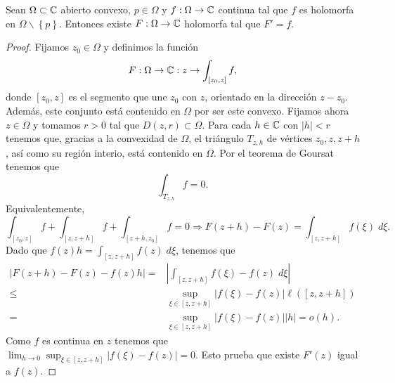 \begin{theorem}
	Sean $\displaystyle \Omega\subset \mathbb{C} $ abierto convexo, $\displaystyle p \in \Omega  $ y $\displaystyle f : \Omega \to \mathbb{C} $ continua tal que $\displaystyle f $ es holomorfa en $\displaystyle \Omega \backslash \left\{ p\right\}  $. Entonces existe $\displaystyle F : \Omega \to \mathbb{C} $ holomorfa tal que $\displaystyle F'=f $.
\end{theorem}
\begin{proof}
Fijamos $\displaystyle z_{0}\in \Omega  $ y definimos la función
\[F : \Omega \to \mathbb{C} : z \to \int _{\left[z_{0}, z\right] }f  ,\]
donde $\displaystyle \left[z_{0}, z\right]  $ es el segmento que une $\displaystyle z_{0} $ con $\displaystyle z $, orientado en la dirección $\displaystyle z-z_{0} $. Además, este conjunto está contenido en $\displaystyle \Omega  $ por ser este convexo. Fijamos ahora $\displaystyle z \in \Omega  $ y tomamos $\displaystyle r > 0 $ tal que $\displaystyle D\left(z,r\right)\subset \Omega  $. Para cada $\displaystyle h \in \mathbb{C} $ con $\displaystyle \left|h\right|<r $ tenemos que, gracias a la convexidad de $\displaystyle \Omega  $, 
el triángulo $\displaystyle T_{z,h} $ de vértices $\displaystyle z_{0}, z, z+h $, así como su región interio, está contenido en $\displaystyle \Omega  $. Por el teorema de Goursat tenemos que 
\[\int _{T_{z,h}}f =0 .\]
Equivalentemente, 
\[\int _{\left[z_{0}, z\right] }f +\int _{\left[z, z+h\right] }f +\int _{\left[z+h, z_{0}\right] }f =0 \Rightarrow F\left(z + h\right)-F\left(z\right)=\int _{\left[z, z+h\right] }f\left(\xi\right) \; d\xi .\]
Dado que $\displaystyle f\left(z\right)h=\int _{\left[z, z + h\right] }f\left(z\right) \; d\xi $, tenemos que 
\[
\begin{split}
	\left|F\left(z + h\right)-F\left(z\right)-f\left(z\right)h\right| = & \left|\int _{\left[z, z+h\right] }f\left(\xi\right)-f\left(z\right) \; d\xi\right| \\
	\leq & \sup_{\xi\in\left[z, z + h\right] } \left|f\left(\xi\right)-f\left(z\right)\right|\ell\left(\left[z , z + h\right] \right)\\
	= & \sup_{\xi\in \left[z, z+ h\right] } \left|f\left(\xi\right)-f\left(z\right)\right| \left|h\right| = o\left(h\right).
\end{split}
\]
Como $\displaystyle f $ es continua en $\displaystyle z $ tenemos que $\displaystyle \lim_{h \to 0}\sup_{\xi\in [z, z + h]} \left|f\left(\xi\right)-f\left(z\right)\right|=0 $. Esto prueba que existe $\displaystyle F'\left(z\right) $ igual a $\displaystyle f\left(z\right) $. 
\end{proof}
